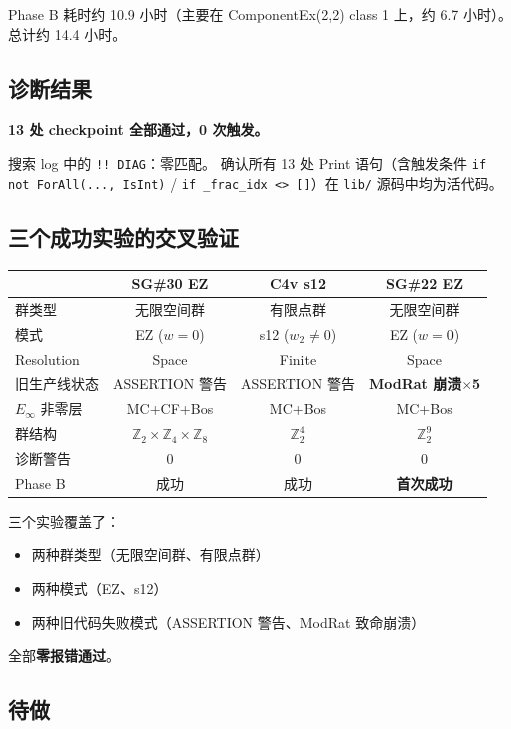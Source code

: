 \documentclass[a4paper,fontset=ubuntu,12pt]{ctexart}
\begin{document}
Phase B 耗时约 10.9 小时（主要在 ComponentEx(2,2) class 1 上，约 6.7 小时）。
总计约 14.4 小时。

\subsection{诊断结果}

\textbf{13 处 checkpoint 全部通过，0 次触发。}

搜索 log 中的 \texttt{!! DIAG}：零匹配。
确认所有 13 处 Print 语句（含触发条件 \texttt{if not ForAll(..., IsInt)}
/ \texttt{if \_frac\_idx <> []}）在 \texttt{lib/} 源码中均为活代码。

\subsection{三个成功实验的交叉验证}

\begin{center}
\begin{tabular}{l|ccc}
\hline
& SG\#30 EZ & C4v s12 & \textbf{SG\#22 EZ} \\
\hline
群类型 & 无限空间群 & 有限点群 & 无限空间群 \\
模式 & EZ ($w=0$) & s12 ($w_2 \neq 0$) & EZ ($w=0$) \\
Resolution & Space & Finite & Space \\
旧生产线状态 & ASSERTION 警告 & ASSERTION 警告 & \textbf{ModRat 崩溃$\times$5} \\
$E_\infty$ 非零层 & MC+CF+Bos & MC+Bos & MC+Bos \\
群结构 & $\mathbb{Z}_2 \times \mathbb{Z}_4 \times \mathbb{Z}_8$
       & $\mathbb{Z}_2^4$
       & $\mathbb{Z}_2^9$ \\
诊断警告 & 0 & 0 & 0 \\
Phase B & 成功 & 成功 & \textbf{首次成功} \\
\hline
\end{tabular}
\end{center}

三个实验覆盖了：
\begin{itemize}
\item 两种群类型（无限空间群、有限点群）
\item 两种模式（EZ、s12）
\item 两种旧代码失败模式（ASSERTION 警告、ModRat 致命崩溃）
\end{itemize}
全部\textbf{零报错通过}。

\subsection{待做}
\end{document}
